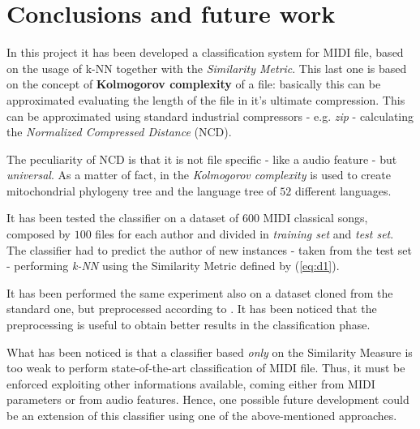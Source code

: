 \documentclass[a4paper]{article}
\begin{document}
	\section{Conclusions and future work}
	\lettrine[nindent=0em,lines=2]{I}{}n this project it has been developed a classification system for MIDI file, based on the usage of k-NN together with the \textit{Similarity Metric}. This last one is based on the concept of \textbf{Kolmogorov complexity} of a file: basically this can be approximated evaluating the length of the file in it's ultimate compression. This can be approximated using standard industrial compressors - e.g. \textit{zip} - calculating the \textit{Normalized Compressed Distance} (NCD). 
	
	The peculiarity of NCD is that it is not file specific - like a audio feature - but \textit{universal}. As a matter of fact, in \cite{kolmogorov} the \textit{Kolmogorov complexity} is used to create mitochondrial phylogeny tree and the language tree of $52$ different languages.
	
	It has been tested the classifier on a dataset of $600$ MIDI classical songs, composed by $100$ files for each author and divided in \textit{training set} and \textit{test set}. The classifier had to predict the author of new instances - taken from the test set - performing \textit{k-NN} using the Similarity Metric defined by (\ref{eq:d1}). 
	
	It has been performed the same experiment also on a dataset cloned from the standard one, but preprocessed according to \cite{melody_class}. It has been noticed that the preprocessing is useful to obtain better results in the classification phase.
	
	What has been noticed is that a classifier based \textit{only} on the Similarity Measure is too weak to perform state-of-the-art classification of MIDI file. Thus, it must be enforced exploiting other informations available, coming either from MIDI parameters or from audio features. Hence, one possible future development could be an extension of this classifier using one of the above-mentioned approaches.
	
\end{document}
